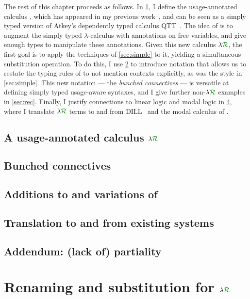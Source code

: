 The rest of this chapter proceeds as follows.
In \cref{sec:lr}, I define the usage-annotated calculus \name{}, which has
appeared in my previous work~\citep{WA21}, and can be seen as a
simply typed version of Atkey's dependently typed calculus QTT~\citep{Atkey18}.
The idea of \name{} is to augment the simply typed $\lambda$-calculus with
annotations on free variables, and give enough types to manipulate these
annotations.
Given this new calculus $\name$, the first goal is to apply the techniques of
\cref{sec:simple} to it, yielding a simultaneous substitution operation.
To do this, I use \cref{sec:lnd} to introduce notation that allows us to restate
the typing rules of \name{} to not mention contexts explicitly, as was the style
in \cref{sec:simple}.
This new notation --- the \emph{bunched connectives} --- is versatile at
defining simply typed usage-aware syntaxes, and I give further non-$\name$
examples in \cref{sec:rec}.
Finally, I justify connections to linear logic and modal logic in
\cref{sec:translation}, where I translate $\name$ terms to and from
DILL~\citep{Barber1996} and the modal calculus of \citet{judgmental}.

\section{A usage-annotated calculus $\name$}\label{sec:lr}

\section{Bunched connectives}\label{sec:lnd}

\section{Additions to and variations of \name{}}\label{sec:variant}

\section{Translation to and from existing systems}\label{sec:translation}

\section{Addendum: (lack of) partiality}\label{sec:part}



\chapter{Renaming and substitution for $\name$}\label{sec:ren-sub-lr}

